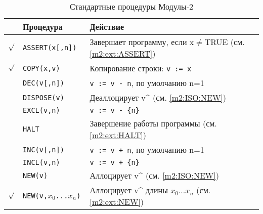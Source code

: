 \begin{table}[hbt]
\begin{center}
\begin{tabular}{|cl|p{6.5cm}|} \hline
&\bf Процедура &\bf Действие \\ \hline
$\surd$ & \tt ASSERT(x[,n]) & Завершает программу, если
                  x$\neq$TRUE (см. \ref{m2:ext:ASSERT})       \\ \index{ASSERT}
$\surd$ & \tt  COPY(x,v)     & Копирование строки: \verb|v := x|       \\ \index{COPY}
&\tt DEC(v[,n])    & \verb|v := v - n|, по умолчанию n=1             \\ \index{DEC}
&\tt DISPOSE(v)    & Деаллоцирует v\^{} (см. \ref{m2:ISO:NEW}) \\ \index{DISPOSE}
&\tt EXCL(v,n)     & \verb|v := v - {n}| \\                    \index{EXCL}
&\tt HALT          & Завершение работы программы
                 (см. \ref{m2:ext:HALT}) \\                    \index{HALT}
&\tt INC(v[,n])    & \verb|v := v + n|, по умолчанию n=1 \\         \index{INC}
&\tt INCL(v,n)     & \verb|v := v + {n}| \\                    \index{INCL}
&\tt NEW(v)        & Аллоцирует v\^{} (см. \ref{m2:ISO:NEW}) \\
$\surd$ & \tt NEW(v,$x_0$...$x_n$) & Аллоцирует v\^{} длины
        $x_0$...$x_n$  (см. \ref{m2:ext:NEW}) \\  %
\hline
\end{tabular}
\end{center}
\caption{Стандартные процедуры Модулы-2}\label{table:m2:stdproc}
\end{table}

